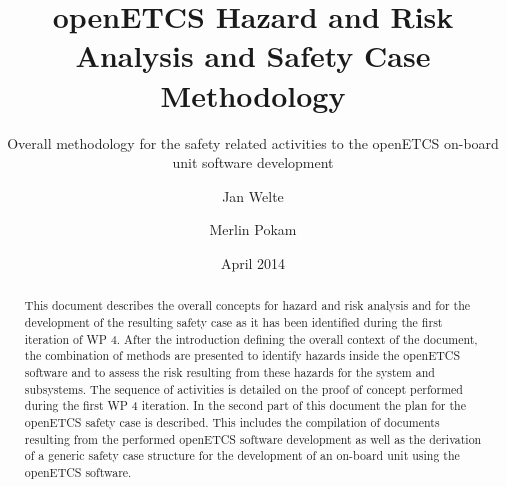 \documentclass{template/openetcs_report}
\begin{document}
\frontmatter
{}




\title{openETCS Hazard and Risk Analysis and Safety Case Methodology}

\subtitle{Overall methodology for the safety related activities to the openETCS on-board unit software development}

\date{April 2014} %


\author{Jan Welte}

  
  
\author{Merlin Pokam}








\begin{abstract}
This document describes the overall concepts for hazard and risk analysis and for the development of the resulting safety case as it has been identified during the first iteration of WP 4.
After the introduction defining the overall context of the document, the combination of methods are presented to identify hazards inside the openETCS software and to assess the risk resulting from these hazards for the system and subsystems. The sequence of activities is detailed on the proof of concept performed during the first WP 4 iteration. In the second part of this document the plan for the openETCS safety case is described. This includes the compilation of documents resulting from the performed openETCS software development as well as the derivation of a generic safety case structure for the development of an on-board unit using the openETCS software.
\end{abstract}
\end{document}
